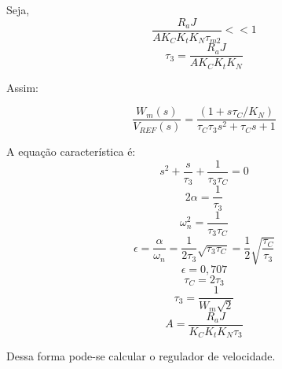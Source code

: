 Seja,
\[\frac{R_{a}J}{AK_{C}K_{t}K_{N}\tau_{m2}} << 1\]
\[\tau_{3} = \frac{R_{a}J}{AK_{C}K_{t}K_{N}} \]

Assim:

\[\frac{W_{m}(s)}{V_{REF}(s)} = \frac{\left(1 + s\tau_{C}/K_{N}\right)}{\tau_{C}\tau_{3}s^{2} + \tau_{C}s + 1}\]

A equação característica é:
\[s^{2} + \frac{s}{\tau_{3}} + \frac{1}{\tau_{3}\tau_{C}} = 0\]
\[2\alpha = \frac{1}{\tau_{3}}\]
\[\omega_{n}^{2} = \frac{1}{\tau_{3}\tau_{C}}\]
\[\epsilon = \frac{\alpha}{\omega_{n}} = \frac{1}{2\tau_{3}}\sqrt{\tau_{3}\tau_{C}} = \frac{1}{2}\sqrt{\frac{\tau_{C}}{\tau_{3}}}\]
\[\epsilon = 0,707\]
\[\tau_{C} = 2\tau_{3}\]
\[\tau_{3} = \frac{1}{W_{m}\sqrt{2}}\]
\[A = \frac{R_{a}J}{K_{C}K_{t}K_{N}\tau_{3}}\]

Dessa forma pode-se calcular o regulador de velocidade.

